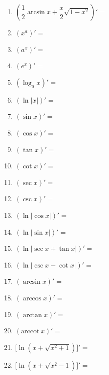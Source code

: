 \documentclass[a4paper,12pt]{article}
\begin{document}
    \pagestyle{empty}

    \begin{enumerate}
        \item $(\dfrac{1}{2}\arcsin x + \dfrac{x}{2}\sqrt{1 - x^2})' =$
    \end{enumerate}

    \begin{minipage}[t]{0.30\textwidth}
        \begin{enumerate}[leftmargin=*, itemsep=1.2em]
            \setcounter{enumi}{1}
            \item $(x^a)' =$

            \item $(a^x)' =$

            \item $(e^x)' =$

            \item $(\log_a x)' =$

            \item $(\ln |x|)' =$

            \item $(\sin x)' =$
            \item $(\cos x)' =$
            \item $(\tan x)' =$
            \item $(\cot x)' =$
            \item $(\sec x)' =$
            \item $(\csc x)' =$
            \item $(\ln|\cos x|)' =$
            \item $(\ln|\sin x|)' =$
            \item $(\ln|\sec x + \tan x|)' =$
            \item $(\ln|\csc x - \cot x|)'=$
            \item $(\arcsin x)' =$
            \item $(\arccos x)' =$
            \item $(\arctan x)' =$
            \item $(\mathrm{arccot}\ x)' =$

            \item $\bigl[\ln (x+\sqrt{x^2+1})\bigr]' =$

            \item $\bigl[\ln (x+\sqrt{x^2-1})\bigr]' =$
        \end{enumerate}
    \end{minipage}
    \hfill
\end{document}
